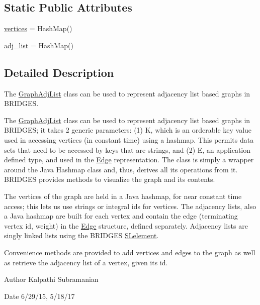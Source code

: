 \subsection*{Static Public Attributes}
\begin{DoxyCompactItemize}
\item 
\hyperlink{class_graph_adj_list_1_1_graph_adj_list_a47f4552a36c0fdc7d7599a7b5b47177d}{vertices} = Hash\+Map()
\item 
\hyperlink{class_graph_adj_list_1_1_graph_adj_list_adf27f860d178d9d0f0aa3c3a6c45afe9}{adj\+\_\+list} = Hash\+Map()
\end{DoxyCompactItemize}


\subsection{Detailed Description}
The \hyperlink{class_graph_adj_list_1_1_graph_adj_list}{Graph\+Adj\+List} class can be used to represent adjacency list based graphs in B\+R\+I\+D\+G\+ES. 

The \hyperlink{class_graph_adj_list_1_1_graph_adj_list}{Graph\+Adj\+List} class can be used to represent adjacency list based graphs in B\+R\+I\+D\+G\+ES; it takes 2 generic parameters\+: (1) K, which is an orderable key value used in accessing vertices (in constant time) using a hashmap. This permits data sets that need to be accessed by keys that are strings, and (2) E, an application defined type, and used in the \hyperlink{namespace_edge}{Edge} representation. The class is simply a wrapper around the Java Hashmap class and, thus, derives all its operations from it. B\+R\+I\+D\+G\+ES provides methods to visualize the graph and its contents.

The vertices of the graph are held in a Java hashmap, for near constant time access; this lets us use strings or integral ids for vertices. The adjacency lists, also a Java hashmap are built for each vertex and contain the edge (terminating vertex id, weight) in the \hyperlink{namespace_edge}{Edge} structure, defined separately. Adjacency lists are singly linked lists using the B\+R\+I\+D\+G\+ES \hyperlink{namespace_s_lelement}{S\+Lelement}.

Convenience methods are provided to add vertices and edges to the graph as well as retrieve the adjacency list of a vertex, given its id.

\begin{DoxyAuthor}{Author}
Kalpathi Subramanian
\end{DoxyAuthor}
\begin{DoxyDate}{Date}
6/29/15, 5/18/17
\end{DoxyDate}


